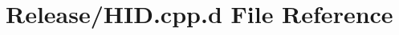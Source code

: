 \hypertarget{_release_2_h_i_d_8cpp_8d}{\section{\-Release/\-H\-I\-D.cpp.\-d \-File \-Reference}
\label{_release_2_h_i_d_8cpp_8d}
}

